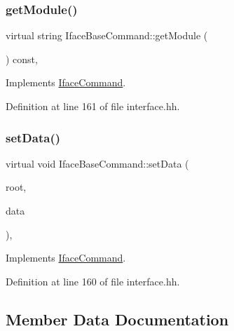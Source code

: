 \subsubsection{\texorpdfstring{getModule()}{getModule()}}
{\footnotesize\ttfamily virtual string Iface\+Base\+Command\+::get\+Module (\begin{DoxyParamCaption}\item[{void}]{ }\end{DoxyParamCaption}) const\hspace{0.3cm}{\ttfamily [inline]}, {\ttfamily [virtual]}}



Implements \mbox{\hyperlink{class_iface_command_a06f9500f4b0a0e3cf14010cf133502d5}{Iface\+Command}}.



Definition at line 161 of file interface.\+hh.

\mbox{\label{class_iface_base_command_a551f7828c74ff2c0324ed4b3c0210039}} 
\subsubsection{\texorpdfstring{setData()}{setData()}}
{\footnotesize\ttfamily virtual void Iface\+Base\+Command\+::set\+Data (\begin{DoxyParamCaption}\item[{\mbox{\hyperlink{class_iface_status}{Iface\+Status}} $\ast$}]{root,  }\item[{\mbox{\hyperlink{class_iface_data}{Iface\+Data}} $\ast$}]{data }\end{DoxyParamCaption})\hspace{0.3cm}{\ttfamily [inline]}, {\ttfamily [virtual]}}



Implements \mbox{\hyperlink{class_iface_command_ad0a0ba80d392ef1346c43283a8c3ca90}{Iface\+Command}}.



Definition at line 160 of file interface.\+hh.



\subsection{Member Data Documentation}
\mbox{\label{class_iface_base_command_ab63ec3a4f15fd6abe779744ab66e454b}} 

